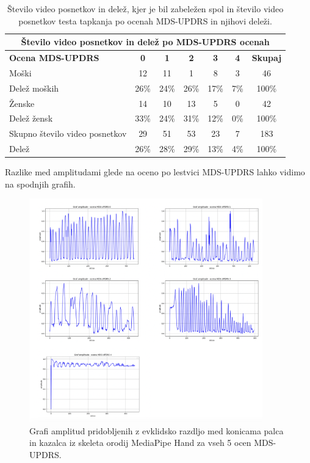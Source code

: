 \documentclass[a4paper,12pt]{article}  %
\begin{document}
\begin{table}[H]
  \centering
  \renewcommand{\arraystretch}{1.3} 
  \begin{longtable}{|l|c|c|c|c|c|c|}
      \hline
      \multicolumn{7}{|c|}{\textbf{Število video posnetkov in delež po MDS-UPDRS ocenah}} \\
      \hline
      \textbf{Ocena MDS-UPDRS} & \textbf{0} & \textbf{1} & \textbf{2} & \textbf{3} & \textbf{4} & \textbf{Skupaj} \\
      \hline
      Moški & 12 & 11 & 1  & 8  & 3  & 46 \\
      Delež moških & 26\% & 24\% & 26\% & 17\% & 7\%  & 100\% \\
      Ženske & 14 & 10 & 13 & 5  & 0  & 42 \\
      Delež žensk & 33\% & 24\% & 31\% & 12\% & 0\%  & 100\% \\
      Skupno število video posnetkov & 29 & 51 & 53 & 23 & 7  & 183 \\
      Delež & 26\% & 28\% & 29\% & 13\% & 4\%  & 100\% \\
      \hline
  \end{longtable}
  \caption{Število video posnetkov in delež, kjer je bil zabeležen spol in število video posnetkov testa tapkanja 
  po ocenah MDS-UPDRS in njihovi deleži.}
  \label{tab:video_posnetki}
\end{table}

Razlike med amplitudami glede na oceno po lestvici MDS-UPDRS lahko vidimo na spodnjih grafih. \\

\begin{figure}[H]
  \centering
  \includegraphics[width=0.9\textwidth]{slike/ocene.png}  
  \caption{Grafi amplitud pridobljenih z evklidsko razdljo med konicama palca in kazalca iz skeleta orodij 
  MediaPipe Hand za vseh 5 ocen MDS-UPDRS.}
  \label{fig:amplitude_ocene}
\end{figure}
\end{document}
